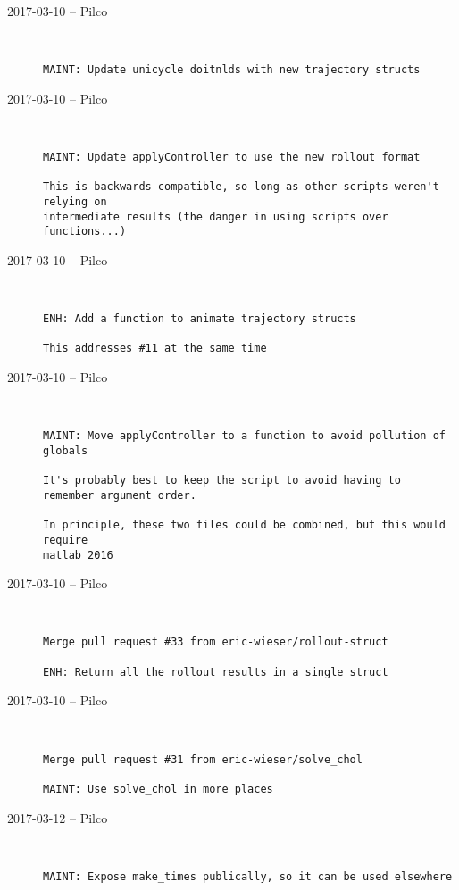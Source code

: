 \begin{description}
  \item[2017-03-10 -- Pilco] \hfill \
\begin{lstlisting}
MAINT: Update unicycle doitnlds with new trajectory structs
\end{lstlisting}


  \item[2017-03-10 -- Pilco] \hfill \
\begin{lstlisting}
MAINT: Update applyController to use the new rollout format

This is backwards compatible, so long as other scripts weren't relying on
intermediate results (the danger in using scripts over functions...)
\end{lstlisting}


  \item[2017-03-10 -- Pilco] \hfill \
\begin{lstlisting}
ENH: Add a function to animate trajectory structs

This addresses #11 at the same time
\end{lstlisting}


  \item[2017-03-10 -- Pilco] \hfill \
\begin{lstlisting}
MAINT: Move applyController to a function to avoid pollution of globals

It's probably best to keep the script to avoid having to remember argument order.

In principle, these two files could be combined, but this would require
matlab 2016
\end{lstlisting}


  \item[2017-03-10 -- Pilco] \hfill \
\begin{lstlisting}
Merge pull request #33 from eric-wieser/rollout-struct

ENH: Return all the rollout results in a single struct\end{lstlisting}


  \item[2017-03-10 -- Pilco] \hfill \
\begin{lstlisting}
Merge pull request #31 from eric-wieser/solve_chol

MAINT: Use solve_chol in more places\end{lstlisting}


  \item[2017-03-12 -- Pilco] \hfill \
\begin{lstlisting}
MAINT: Expose make_times publically, so it can be used elsewhere
\end{lstlisting}



\end{description}
